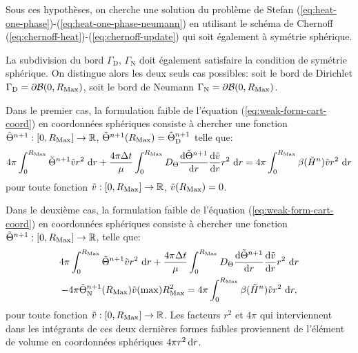 Sous ces hypothèses, on cherche une solution du problème de Stefan
(\ref{eq:heat-one-phase})-(\ref{eq:heat-one-phase-neumann}) en
utilisant le schéma de Chernoff
(\ref{eq:chernoff-heat})-(\ref{eq:chernoff-update}) qui soit également
à symétrie sphérique.

La subdivision du bord $\Gamma_\mathrm{D}$, $\Gamma_\mathrm{N}$ doit
également satisfaire la condition de symétrie sphérique. On distingue alors les
deux seuls cas possibles:
soit le bord de Dirichlet $\Gamma_\mathrm{D} = \partial\mathcal
B(0,R_\mathrm{Max})$, soit le bord de Neumann $\Gamma_\mathrm{N} =
\partial\mathcal B(0,R_\mathrm{Max})$.

Dans le premier cas, la formulation faible de l'équation
(\ref{eq:weak-form-cart-coord}) en coordonnées sphériques consiste à
chercher une fonction $\tilde {\Theta}^{n+1}:[0,R_\mathrm{Max}] \to \mathbb
R$, $\tilde{\Theta}^{n+1}(R_\mathrm{Max}) =
\tilde{\Theta}_{\mathrm{D}}^{n+1}$ telle que:
\begin{multline}\label{eq:weak-form-spher-coord-dirichlet}
  4\pi\int_0^{\rmax} \tilde \temperature^{n+1}\tilde v r^2\,\intd{r}
  + \frac{4\pi\timestep}{\mu}\int_0^{\rmax} \electrolytetdiff\frac{\mathrm d %
    \tilde \temperature^{n+1}}{\mathrm d r} \frac{\mathrm d \tilde v}{\mathrm d %
    r}r^2\,\intd{r}  %
  = 4\pi\int_0^{\rmax} \beta(\tilde \enthalpydensity^n)\tilde v r^2\,\intd{r}
\end{multline}
pour toute fonction $\tilde v:[0,R_\mathrm{Max}]\to\mathbb R$, $\tilde v(R_\mathrm{Max})
= 0$.

Dans le deuxième cas, la formulation faible de l'équation
(\ref{eq:weak-form-cart-coord}) en coordonnées sphériques consiste à
chercher une fonction $\tilde {\Theta}^{n+1}:[0,R_\mathrm{Max}] \to \mathbb
R$, telle que:
\begin{multline}\label{eq:weak-form-spher-coord-neumann}
  4\pi\int_0^{\rmax} \tilde \temperature^{n+1}\tilde v r^2\,\intd{r}
  + \frac{4\pi\timestep}{\mu}\int_0^{\rmax} \electrolytetdiff\frac{\mathrm d %
    \tilde \temperature^{n+1}}{\mathrm d r} \frac{\mathrm d \tilde v}{\mathrm d %
    r}r^2\,\intd{r} \\
  - 4\pi\tilde\temperature^{n+1}_\mathrm{N}(\rmax)\tilde v(\max)\rmax^2%
  = 4\pi\int_0^{\rmax} \beta(\tilde \enthalpydensity^n)\tilde v r^2\,\intd{r},
\end{multline}
pour toute fonction $\tilde v:[0,R_\mathrm{Max}]\to\mathbb R$. Les facteurs
$r^2$ et $4\pi$ qui interviennent dans les intégrants de ces deux dernières
formes faibles proviennent de l'élément de volume en
coordonnées sphériques $4\pi r^2\,\mathrm dr$.

